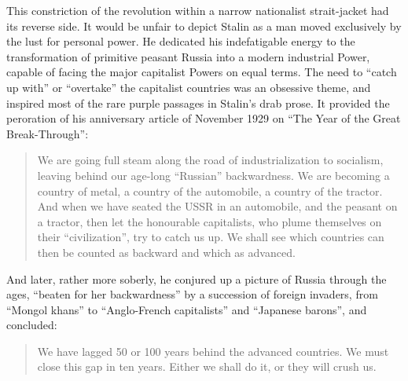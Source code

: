 This constriction of the revolution within a narrow nationalist strait-jacket had its reverse side. It would be unfair to depict Stalin as a man moved exclusively by the lust for personal power. He dedicated his indefatigable energy to the transformation of primitive peasant Russia into a modern industrial Power, capable of facing the major capitalist Powers on equal terms. The need to ``catch up with'' or ``overtake'' the capitalist countries was an obsessive theme, and inspired most of the rare purple passages in Stalin's drab prose. It provided the peroration of his anniversary article of November 1929 on ``The Year of the Great Break-Through'': 

\begin{quote}
We are going full steam along the road of industrialization to socialism, leaving behind our age-long ``Russian'' backwardness. We are becoming a country of metal, a country of the automobile, a country of the tractor. And when we have seated the USSR in an automobile, and the peasant on a tractor, then let the honourable capitalists, who plume themselves on their ``civilization'', try to catch us up. We shall see which countries can then be counted as backward and which as advanced. 
\end{quote}

And later, rather more soberly, he conjured up a picture of Russia through the ages, ``beaten for her backwardness'' by a succession of foreign invaders, from ``Mongol khans'' to ``Anglo-French capitalists'' and ``Japanese barons'', and concluded: 

\begin{quote}
We have lagged 50 or 100 years behind the advanced countries. We must close this gap in ten years. Either we shall do it, or they will crush us. 
\end{quote}

